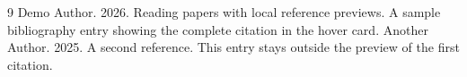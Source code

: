 \documentclass[11pt]{article}
\begin{document}
\clearpage
\begin{thebibliography}{9}
 Demo Author. 2026. Reading papers with local reference previews.
A sample bibliography entry showing the complete citation in the hover card.
 Another Author. 2025. A second reference.
This entry stays outside the preview of the first citation.
\end{thebibliography}
\end{document}
